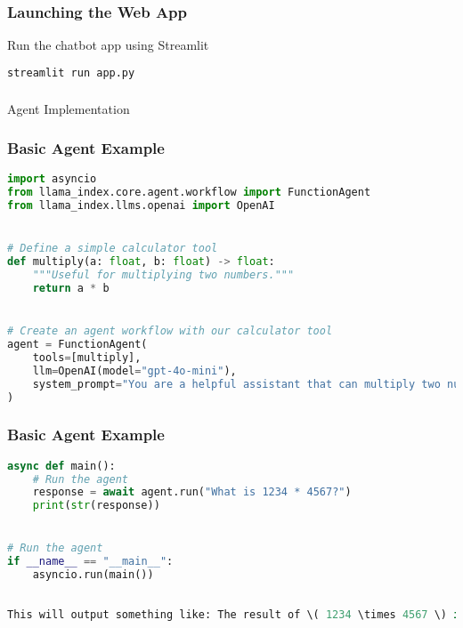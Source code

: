 \begin{frame}[fragile]\frametitle{Launching the Web App}

Run the chatbot app using Streamlit

\begin{lstlisting}[language=bash]
streamlit run app.py
\end{lstlisting}

\end{frame}


\begin{frame}[fragile]\frametitle{}
\begin{center}
{\Large Agent Implementation}
\end{center}
\end{frame}


\begin{frame}[fragile]\frametitle{Basic Agent Example}
\begin{lstlisting}[language=Python]
import asyncio
from llama_index.core.agent.workflow import FunctionAgent
from llama_index.llms.openai import OpenAI


# Define a simple calculator tool
def multiply(a: float, b: float) -> float:
    """Useful for multiplying two numbers."""
    return a * b


# Create an agent workflow with our calculator tool
agent = FunctionAgent(
    tools=[multiply],
    llm=OpenAI(model="gpt-4o-mini"),
    system_prompt="You are a helpful assistant that can multiply two numbers.",
)
\end{lstlisting}
\end{frame}


\begin{frame}[fragile]\frametitle{Basic Agent Example}
\begin{lstlisting}[language=Python]
async def main():
    # Run the agent
    response = await agent.run("What is 1234 * 4567?")
    print(str(response))


# Run the agent
if __name__ == "__main__":
    asyncio.run(main())
	
	
This will output something like: The result of \( 1234 \times 4567 \) is \( 5,678,678 \).
\end{lstlisting}
\end{frame}



